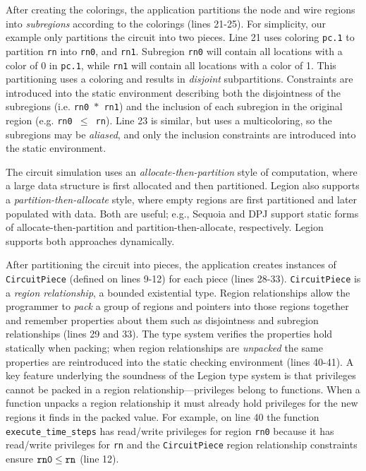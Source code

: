 After creating the colorings, the application partitions the node and wire
regions into {\em subregions} according to the colorings (lines 21-25).  For
simplicity, our example only partitions the circuit into two pieces.
Line 21 uses coloring {\tt pc.1} to partition {\tt rn} into {\tt rn0}, and {\tt rn1}.
Subregion {\tt rn0} will contain all locations with a color of 0 in {\tt pc.1},
while {\tt rn1} will contain all locations with a color of 1.  This
partitioning uses a coloring and results in {\em disjoint} subpartitions.
Constraints are introduced into the static environment describing both the
disjointness of the subregions (i.e. {\tt rn0 $*$ rn1}) and the inclusion of
each subregion in the original region (e.g. {\tt rn0 $\leq$ rn}).  Line
23 is similar, but uses a multicoloring, so the subregions may be {\em aliased},
and only the inclusion constraints are introduced into the static environment.

The circuit simulation uses an {\em allocate-then-partition} style of
computation, where a large data structure is first allocated and then
partitioned.  Legion also supports a {\em partition-then-allocate} style,
where empty regions are first partitioned and later populated with
data.  Both are useful; e.g., Sequoia \cite{Fatahalian06} and DPJ
\cite{Bocchino09} support static forms of allocate-then-partition and
partition-then-allocate, respectively.  Legion supports both
approaches dynamically.

After partitioning the circuit into pieces, the application creates
instances of {\tt CircuitPiece} (defined on lines 9-12) for each piece
(lines 28-33).  {\tt CircuitPiece} is a {\em region relationship}, a
bounded existential type.  Region relationships allow the programmer
to {\em pack} a group of regions and pointers into those regions together
and remember properties
about them such as disjointness and subregion relationships (lines 29
and 33).  The type system verifies the properties hold statically when
packing; when region relationships are {\em unpacked} the same
properties are reintroduced into the static checking environment
(lines 40-41).  A key feature underlying the soundness of the Legion
type system is that privileges cannot be packed in a region
relationship---privileges belong to functions. When a function unpacks
a region relationship it must already hold privileges for the new
regions it finds in the packed value.  For example, on line 40 the
function {\tt execute\_time\_steps} has read/write privileges for
region {\tt rn0} because it has read/write privileges for {\tt rn} and
the {\tt CircuitPiece} region relationship constraints ensure $\tt rn0
\leq rn$ (line 12).

